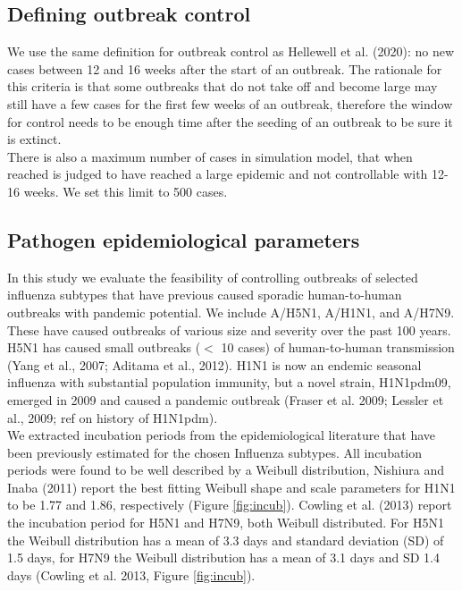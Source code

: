 \documentclass{article}
\begin{document}
\subsection{Defining outbreak control}

We use the same definition for outbreak control as Hellewell et al. (2020): no new cases between 12 and 16 weeks after the start of an outbreak. The rationale for this criteria is that some outbreaks that do not take off and become large may still have a few cases for the first few weeks of an outbreak, therefore the window for control needs to be enough time after the seeding of an outbreak to be sure it is extinct. \\

There is also a maximum number of cases in simulation model, that when reached is judged to have reached a large epidemic and not controllable with 12-16 weeks. We set this limit to 500 cases.

\subsection{Pathogen epidemiological parameters} \label{epiparameters}

In this study we evaluate the feasibility of controlling outbreaks of selected influenza subtypes that have previous caused sporadic human-to-human outbreaks with pandemic potential. We include A/H5N1, A/H1N1, and A/H7N9. These have caused outbreaks of various size and severity over the past 100 years. H5N1 has caused small outbreaks ($<$ 10 cases) of human-to-human transmission (Yang et al., 2007; Aditama et al., 2012). H1N1 is now an endemic seasonal influenza with substantial population immunity, but a novel strain, H1N1pdm09, emerged in 2009 and caused a pandemic outbreak (Fraser et al. 2009; Lessler et al., 2009; ref on history of H1N1pdm). \\

We extracted incubation periods from the epidemiological literature that have been previously estimated for the chosen Influenza subtypes. All incubation periods were found to be well described by a Weibull distribution, Nishiura and Inaba (2011) report the best fitting Weibull shape and scale parameters for H1N1 to be 1.77 and 1.86, respectively (Figure \ref{fig:incub}). Cowling et al. (2013) report the incubation period for H5N1 and H7N9, both Weibull distributed. For H5N1 the Weibull distribution has a mean of 3.3 days and standard deviation (SD) of 1.5 days, for H7N9 the Weibull distribution has a mean of 3.1 days and SD 1.4 days (Cowling et al. 2013, Figure \ref{fig:incub}). \\
\end{document}
